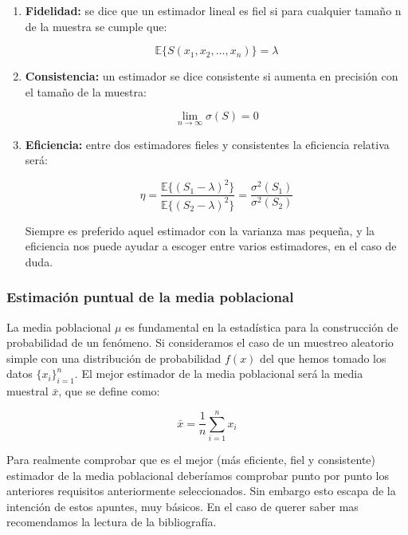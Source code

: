 \documentclass[12pt,a4paper]{book}
\newcommand{\EE}[1]{ \mathbb{E} \{ #1 \}  }
\newcommand{\corchetes}[1]{\{ #1 \}}
\begin{document}
\begin{enumerate}
\item \textbf{Fidelidad:} se dice que un estimador lineal es fiel si para cualquier tamaño n de la muestra se cumple que:

\begin{equation}
\EE{S(x_1, x_2, \ldots, x_n)}= \lambda
\end{equation}

\item \textbf{Consistencia:} un estimador se dice consistente si aumenta en precisión con el tamaño de la muestra:

\begin{equation}
\lim_{n \rightarrow \infty}  \sigma(S) = 0
\end{equation}

\item \textbf{Eficiencia:} entre dos estimadores fieles y consistentes la eficiencia relativa será:

\begin{equation}
\eta = \dfrac{\EE{(S_1-\lambda)^2}}{\EE{(S_2-\lambda)^2}} = \dfrac{\sigma^2(S_1)}{\sigma^2(S_2)}
\end{equation}

Siempre es preferido aquel estimador con la varianza mas pequeña, y la eficiencia nos puede ayudar a escoger entre varios estimadores, en el caso de duda.

\end{enumerate}

\subsubsection{Estimación puntual de la media poblacional}

La media poblacional $\mu$ es fundamental en la estadística para la construcción de probabilidad de un fenómeno.  Si consideramos el caso de un muestreo aleatorio simple con una distribución de probabilidad $f(x)$ del que hemos tomado los datos $\corchetes{x_i}_{i=1}^n$. El mejor estimador de la media poblacional será la media muestral $\bar{x}$, que se define como:

\begin{equation}
\bar{x} = \dfrac{1}{n} \sum_{i=1}^n x_i
\end{equation}

Para realmente comprobar que es el mejor (más eficiente, fiel y consistente) estimador de la media poblacional deberíamos comprobar punto por punto los anteriores requisitos anteriormente seleccionados. Sin embargo esto escapa de la intención de estos apuntes, muy básicos. En el caso de querer saber mas recomendamos la lectura de la bibliografía. \\
\end{document}

